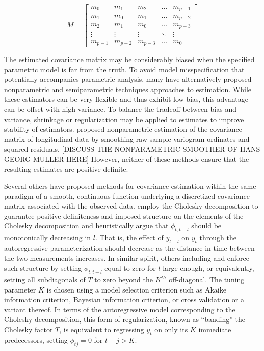 \documentclass[12pt]{article}
\theoremstyle{definition}
\begin{document}
\begin{equation}
M = \begin{bmatrix} m_0 & m_1 & m_2 & \dots & m_{p-1}\\ m_1 & m_0 & m_1 & \dots & m_{p-2}\\m_2 & m_1 & m_0 & \dots & m_{p-3}\\ \vdots & \vdots & \vdots & \ddots & \vdots\\  m_{p-1} & m_{p-2} & m_{p-3} & \dots & m_0 \end{bmatrix} \label{toeplitz}
\end{equation}

\bigskip

The estimated covariance matrix may be considerably biased when the specified parametric model is far from the truth.  To avoid model misspecification that potentially accompanies parametric analysis, many have alternatively  proposed nonparametric and semiparametric techniques approaches to estimation.  While these estimators can be very flexible and thus exhibit low bias, this advantage can be offset with high variance.  To balance the tradeoff between bias and variance, shrinkage or regularization may be applied to estimates to improve stability of estimators. \citet{diggle1998nonparametric} proposed nonparametric estimation of the covariance matrix of longitudinal data by smoothing raw sample variogram ordinates and squared residuals.  [DISCUSS THE NONPARAMETRIC SMOOTHER OF HANS GEORG MULLER HERE]  However, neither of these methods ensure that the resulting estimates are positive-definite.  

\bigskip
Several others have proposed methods for covariance estimation within the same paradigm of a smooth, continuous function underlying a discretized covariance matrix associated with the observed data. 
\citet{pourahmadi1999joint} employ the Cholesky decomposition to guarantee positive-definiteness and imposed structure on the elements of the Cholesky decomposition and heuristically argue that $\phi_{t,t-l}$ should be monotonically decreasing in $l$. That is, the effect of $y_{t-l}$ on $y_t$ through the autoregressive parameterization should decrease as the distance in time between the two measurements increases. In similar spirit, others including \citet{bickel2008regularized} and \citet{levina2008sparse} enforce such structure by setting $\phi_{t,t-l}$ equal to zero for $l$ large enough, or equivalently, setting all subdiagonals of $T$ to zero beyond the $K^{th}$ off-diagonal. The tuning parameter $K$ is chosen using a model selection criterion such as Akaike information criterion, Bayesian information criterion, or cross validation or a variant thereof.  In terms of the autoregressive model corresponding to the Cholesky decomposition, this form of regularization, known as ``banding'' the Cholesky factor $T$, is equivalent to regressing $y_t$ on only its $K$ immediate predecessors, setting $\phi_{tj} = 0$ for $t-j>K$. 
\end{document}
